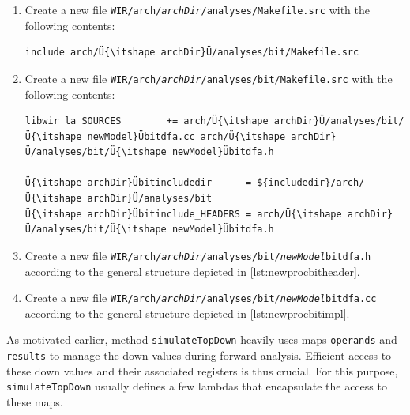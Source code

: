 \begin{enumerate}
\begin{lstlisting}[style=code,float=!t,caption={Definition of Lambdas for Top-Down Analysis},label=lst:topDownLambdas1]
    // Get down value from map operands, update it to the correct bit width needed by n-th parameter.
    auto æ&æv = operands.at@(@ it->get@()@.getID@() )@;
    updateOperand@(@ it->get@()@, v @)@;

    return@(@ v @)@;
  };

  [...]
};
\end{lstlisting}

  \item Create a new file \texttt{WIR/arch/{\itshape archDir}/analyses/Makefile.src} with the following contents: \\
\begin{lstlisting}[style=code,float=h,xleftmargin=10mm,aboveskip=-0.8 \baselineskip,belowskip=-0.8 \baselineskip]
include arch/Ü{\itshape archDir}Ü/analyses/bit/Makefile.src
\end{lstlisting}

  \item Create a new file \texttt{WIR/arch/{\itshape archDir}/analyses/bit/Makefile.src} with the following contents: \\
\begin{lstlisting}[style=code,float=!h,xleftmargin=10mm,aboveskip=-0.8 \baselineskip,belowskip=-0.8 \baselineskip]
libwir_la_SOURCES        += arch/Ü{\itshape archDir}Ü/analyses/bit/Ü{\itshape newModel}Übitdfa.cc arch/Ü{\itshape archDir}Ü/analyses/bit/Ü{\itshape newModel}Übitdfa.h

Ü{\itshape archDir}Übitincludedir      = ${includedir}/arch/Ü{\itshape archDir}Ü/analyses/bit
Ü{\itshape archDir}Übitinclude_HEADERS = arch/Ü{\itshape archDir}Ü/analyses/bit/Ü{\itshape newModel}Übitdfa.h
\end{lstlisting}

  \item Create a new file \texttt{WIR/arch/{\itshape archDir}/analyses/bit/{\itshape newModel}bitdfa.h} according to the general structure depicted in \cref{lst:newprocbitheader}.

  \item Create a new file \texttt{WIR/arch/{\itshape archDir}/analyses/bit/{\itshape newModel}bitdfa.cc} according to the general structure depicted in \cref{lst:newprocbitimpl}.
\end{enumerate}

As motivated earlier, method \texttt{simulateTopDown} heavily uses maps \texttt{operands} and \texttt{results} to manage the down values during forward analysis.
Efficient access to these down values and their associated registers is thus crucial.
For this purpose, \texttt{simulateTopDown} usually defines a few lambdas that encapsulate the access to these maps.

